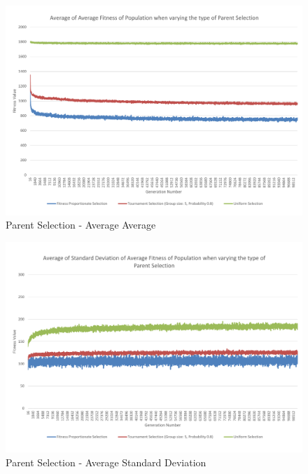 \begin{landscape}
\begin{figure}[thbp]
	\centerline{\includegraphics[height=0.945\textwidth]{figures/CircleTests/ParentSelection/CircleTestParentSelectionAverageAverage.pdf}}
	\caption{Parent Selection - Average Average}
\end{figure}
\end{landscape}

\begin{landscape}
\begin{figure}[thbp]
	\centerline{\includegraphics[height=0.945\textwidth]{figures/CircleTests/ParentSelection/CircleTestParentSelectionAverageStandardDeviation.pdf}}
	\caption{Parent Selection - Average Standard Deviation}
\end{figure}
\end{landscape}


